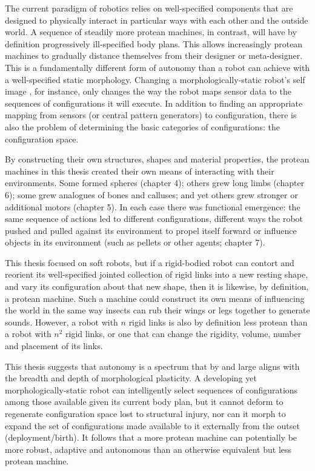 The current paradigm of robotics relies on well-specified components that are designed to physically interact in particular ways with each other and the outside world.
A sequence of steadily more protean machines, in contrast, will have by definition progressively ill-specified body plans.
This allows increasingly protean machines to gradually distance themselves from their designer or meta-designer.
This is a fundamentally different form of autonomy than a robot can achieve with a well-specified static morphology.
Changing a morphologically-static robot's self image \cite{bongard2006resilient,cully2015robots}, for instance, 
only changes the way the robot maps sensor data to 
the sequences of configurations it will execute.
In addition to finding an appropriate mapping from sensors (or central pattern generators) to configuration, 
there is also the problem of determining the basic categories of configurations: the configuration space.

By constructing their own structures, shapes and material properties, 
the protean machines in this thesis created their own means of interacting with their environments.
Some formed spheres (chapter 4); others grew long limbs (chapter 6); 
some grew analogues of bones and calluses; and yet others grew stronger or additional motors (chapter 5).
In each case there was functional emergence: 
the same sequence of actions led to different configurations, different ways the robot pushed and pulled against its environment to propel itself forward or influence objects in its environment (such as pellets or other agents; chapter 7).


This thesis focused on soft robots,
but if a rigid-bodied robot can contort and reorient its well-specified jointed collection of rigid links into a new resting shape, and vary its configuration about that new shape, then it is likewise, by definition, a protean machine.
Such a machine could construct its own means of influencing the world in the same way insects can rub their wings or legs together
to generate sounds.
However, a robot with $n$ rigid links is also by definition less protean than a robot with $n^2$ rigid links, or one that can change the rigidity, volume, number and placement of its links.

This thesis suggests that autonomy is a spectrum that by and large aligns with the breadth and depth of morphological plasticity.
A developing yet morphologically-static robot \cite{husbands1998better,floreano1996plastic,bongard2011morphological,bongard2006resilient,cully2015robots} can intelligently select sequences of configurations among those available given its current body plan,
but it cannot deform to regenerate configuration space lost to structural injury, nor can it morph to expand the set of configurations made available to it externally from the outset (deployment/birth).
It follows that a more protean machine can potentially be more robust, adaptive and autonomous than an otherwise equivalent but less protean machine.


